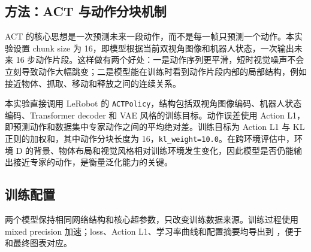 \documentclass[lang=cn,a4paper,newtx,nofont,code=minted]{elegantpaper}
\begin{document}
\subsection{方法：ACT 与动作分块机制}

ACT 的核心思想是一次预测未来一段动作，而不是每一帧只预测一个动作。本实验设置 chunk size 为 16，即模型根据当前双视角图像和机器人状态，一次输出未来 16 步动作片段。这样做有两个好处：一是动作序列更平滑，短时视觉噪声不会立刻导致动作大幅跳变；二是模型能在训练时看到动作片段内部的局部结构，例如接近物体、抓取、移动和释放之间的连续关系。

本实验直接调用 LeRobot 的 \texttt{ACTPolicy}，结构包括双视角图像编码、机器人状态编码、Transformer decoder 和 VAE 风格的训练目标。动作误差使用 Action L1，即预测动作和数据集中专家动作之间的平均绝对差。训练目标为 Action L1 与 KL 正则的加权和，其中动作分块长度为 16，\texttt{kl\_weight=10.0}。在跨环境评估中，环境 D 的背景、物体布局和视觉风格相对训练环境发生变化，因此模型是否仍能输出接近专家的动作，是衡量泛化能力的关键。

\subsection{训练配置}

两个模型保持相同网络结构和核心超参数，只改变训练数据来源。训练过程使用 mixed precision 加速；loss、Action L1、学习率曲线和配置摘要均导出到 ，便于和最终图表对应。
\end{document}
